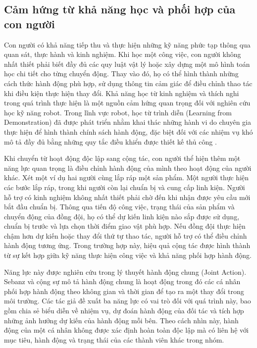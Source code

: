 \subsection{Cảm hứng từ khả năng học và phối hợp của con người}

Con người có khả năng tiếp thu và thực hiện những kỹ năng phức tạp thông qua quan sát, thực hành và kinh nghiệm. Khi học một công việc, con người không nhất thiết phải biết đầy đủ các quy luật vật lý hoặc xây dựng một mô hình toán học chi tiết cho từng chuyển động. Thay vào đó, họ có thể hình thành những cách thức hành động phù hợp, sử dụng thông tin cảm giác để điều chỉnh thao tác khi điều kiện thực hiện thay đổi. Khả năng học từ kinh nghiệm và thích nghi trong quá trình thực hiện là một nguồn cảm hứng quan trọng đối với nghiên cứu học kỹ năng robot. Trong lĩnh vực robot, học từ trình diễn (Learning from Demonstration) đã được phát triển nhằm khai thác những hành vi do chuyên gia thực hiện để hình thành chính sách hành động, đặc biệt đối với các nhiệm vụ khó mô tả đầy đủ bằng những quy tắc điều khiển được thiết kế thủ công \cite{argall2009asurveyrobotlearning}.

Khi chuyển từ hoạt động độc lập sang cộng tác, con người thể hiện thêm một năng lực quan trọng là điều chỉnh hành động của mình theo hoạt động của người khác. Xét một ví dụ hai người cùng lắp ráp một sản phẩm. Một người thực hiện các bước lắp ráp, trong khi người còn lại chuẩn bị và cung cấp linh kiện. Người hỗ trợ có kinh nghiệm không nhất thiết phải chờ đến khi nhận được yêu cầu mới bắt đầu chuẩn bị. Thông qua tiến độ công việc, trạng thái của sản phẩm và chuyển động của đồng đội, họ có thể dự kiến linh kiện nào sắp được sử dụng, chuẩn bị trước và lựa chọn thời điểm giao vật phù hợp. Nếu đồng đội thực hiện chậm hơn dự kiến hoặc thay đổi thứ tự thao tác, người hỗ trợ có thể điều chỉnh hành động tương ứng. Trong trường hợp này, hiệu quả cộng tác được hình thành từ sự kết hợp giữa kỹ năng thực hiện công việc và khả năng phối hợp hành động.

Năng lực này được nghiên cứu trong lý thuyết hành động chung (Joint Action). Sebanz và cộng sự \cite{sebanz2006jointaction} mô tả hành động chung là hoạt động trong đó các cá nhân phối hợp hành động theo không gian và thời gian để tạo ra một thay đổi trong môi trường. Các tác giả đề xuất ba năng lực có vai trò đối với quá trình này, bao gồm chia sẻ biểu diễn về nhiệm vụ, dự đoán hành động của đối tác và tích hợp những ảnh hưởng dự kiến của hành động mỗi bên. Theo cách nhìn này, hành động của một cá nhân không được xác định hoàn toàn độc lập mà có liên hệ với mục tiêu, hành động và trạng thái của các thành viên khác trong nhóm.

